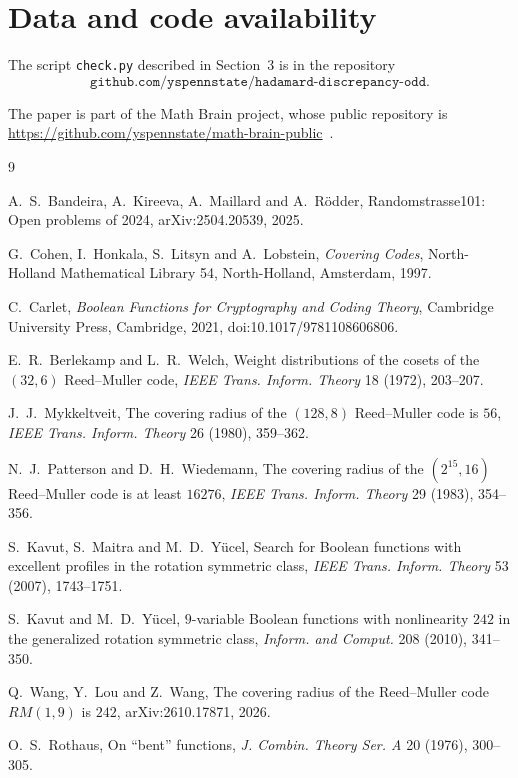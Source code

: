 \documentclass[11pt]{amsart}
\theoremstyle{remark}
\begin{document}
\section*{Data and code availability}

The script \texttt{check.py} described in Section~3 is in the repository
\[
\texttt{github.com/yspennstate/hadamard-discrepancy-odd}.
\]

The paper is part of the Math Brain project, whose public repository is \url{https://github.com/yspennstate/math-brain-public}~\cite{MathBrainRepo}.

\begin{thebibliography}{9}

A.~S.~Bandeira, A.~Kireeva, A.~Maillard and A.~R\"odder, Randomstrasse101: Open
problems of 2024, arXiv:2504.20539, 2025.

G.~Cohen, I.~Honkala, S.~Litsyn and A.~Lobstein, \emph{Covering Codes},
North-Holland Mathematical Library 54, North-Holland, Amsterdam, 1997.

C.~Carlet, \emph{Boolean Functions for Cryptography and Coding Theory}, Cambridge
University Press, Cambridge, 2021, doi:10.1017/9781108606806.

E.~R.~Berlekamp and L.~R.~Welch, Weight distributions of the cosets of the
$(32,6)$ Reed--Muller code, \emph{IEEE Trans. Inform. Theory} 18 (1972), 203--207.

J.~J.~Mykkeltveit, The covering radius of the $(128,8)$ Reed--Muller code is $56$,
\emph{IEEE Trans. Inform. Theory} 26 (1980), 359--362.

N.~J.~Patterson and D.~H.~Wiedemann, The covering radius of the $(2^{15},16)$
Reed--Muller code is at least $16276$, \emph{IEEE Trans. Inform. Theory} 29 (1983),
354--356.

S.~Kavut, S.~Maitra and M.~D.~Y\"ucel, Search for Boolean functions with excellent
profiles in the rotation symmetric class, \emph{IEEE Trans. Inform. Theory} 53 (2007),
1743--1751.

S.~Kavut and M.~D.~Y\"ucel, $9$-variable Boolean functions with nonlinearity $242$
in the generalized rotation symmetric class, \emph{Inform. and Comput.} 208 (2010),
341--350.

Q.~Wang, Y.~Lou and Z.~Wang, The covering radius of the Reed--Muller code $RM(1,9)$
is $242$, arXiv:2610.17871, 2026.

O.~S.~Rothaus, On ``bent'' functions, \emph{J. Combin. Theory Ser. A} 20 (1976),
300--305.


\end{thebibliography}
\end{document}

